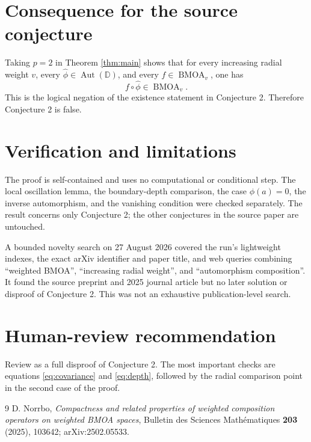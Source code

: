 \documentclass[11pt]{article}
\newcommand{\D}{\mathbb D}
\newcommand{\Aut}{\operatorname{Aut}(\D)}
\newcommand{\BMOA}{\operatorname{BMOA}}
\begin{document}
\section{Consequence for the source conjecture}

Taking $p=2$ in Theorem \ref{thm:main} shows that for every increasing radial weight $v$, every $\widehat\phi\in\Aut$, and every $f\in\BMOA_v$, one has
\[
 f\circ\widehat\phi\in\BMOA_v.
\]
This is the logical negation of the existence statement in Conjecture 2. Therefore Conjecture 2 is false.

\section{Verification and limitations}

The proof is self-contained and uses no computational or conditional step. The local oscillation lemma, the boundary-depth comparison, the case $\phi(a)=0$, the inverse automorphism, and the vanishing condition were checked separately. The result concerns only Conjecture 2; the other conjectures in the source paper are untouched.

A bounded novelty search on 27 August 2026 covered the run's lightweight indexes, the exact arXiv identifier and paper title, and web queries combining ``weighted BMOA'', ``increasing radial weight'', and ``automorphism composition''. It found the source preprint and 2025 journal article but no later solution or disproof of Conjecture 2. This was not an exhaustive publication-level search.

\section{Human-review recommendation}

Review as a full disproof of Conjecture 2. The most important checks are equations \eqref{eq:covariance} and \eqref{eq:depth}, followed by the radial comparison point in the second case of the proof.

\begin{thebibliography}{9}
D. Norrbo,
\emph{Compactness and related properties of weighted composition operators on weighted BMOA spaces},
Bulletin des Sciences Math\'ematiques \textbf{203} (2025), 103642;
arXiv:2502.05533.
\end{thebibliography}
\end{document}
